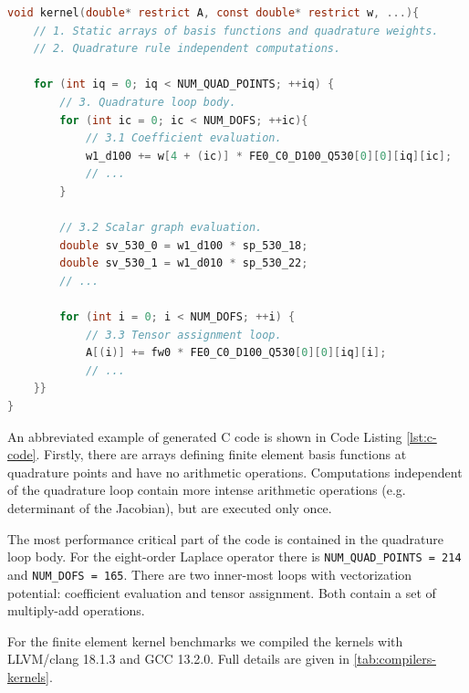 \lstset{style=CStyle}
\begin{lstlisting}[language=c,
    caption=Abbreviated FFCx generated finite element kernel.,
    basicstyle=\ttfamily\scriptsize,
    keywordstyle=\ttb\color{deepblue}\scriptsize,
    label=lst:c-code]
void kernel(double* restrict A, const double* restrict w, ...){
    // 1. Static arrays of basis functions and quadrature weights.
    // 2. Quadrature rule independent computations.

    for (int iq = 0; iq < NUM_QUAD_POINTS; ++iq) {
        // 3. Quadrature loop body.
        for (int ic = 0; ic < NUM_DOFS; ++ic){
            // 3.1 Coefficient evaluation.
            w1_d100 += w[4 + (ic)] * FE0_C0_D100_Q530[0][0][iq][ic];
            // ...
        }

        // 3.2 Scalar graph evaluation.
        double sv_530_0 = w1_d100 * sp_530_18;
        double sv_530_1 = w1_d010 * sp_530_22;
        // ...

        for (int i = 0; i < NUM_DOFS; ++i) {
            // 3.3 Tensor assignment loop.
            A[(i)] += fw0 * FE0_C0_D100_Q530[0][0][iq][i];
            // ...
    }}
}
\end{lstlisting}

An abbreviated example of generated C code is shown in Code Listing
\ref{lst:c-code}. Firstly, there are arrays defining finite element basis
functions at quadrature points and have no arithmetic operations. Computations
independent of the quadrature loop contain more intense arithmetic operations
(e.g. determinant of the Jacobian), but are executed only once.

The most performance critical part of the code is contained in the quadrature
loop body. For the eight-order Laplace operator there is
\lstinline{NUM_QUAD_POINTS = 214} and \lstinline{NUM_DOFS = 165}. There are two
inner-most loops with vectorization potential: coefficient evaluation and
tensor assignment. Both contain a set of multiply-add operations.

For the finite element kernel benchmarks we compiled the kernels with
LLVM/clang 18.1.3 and GCC 13.2.0. Full details are given in
\autoref{tab:compilers-kernels}.

